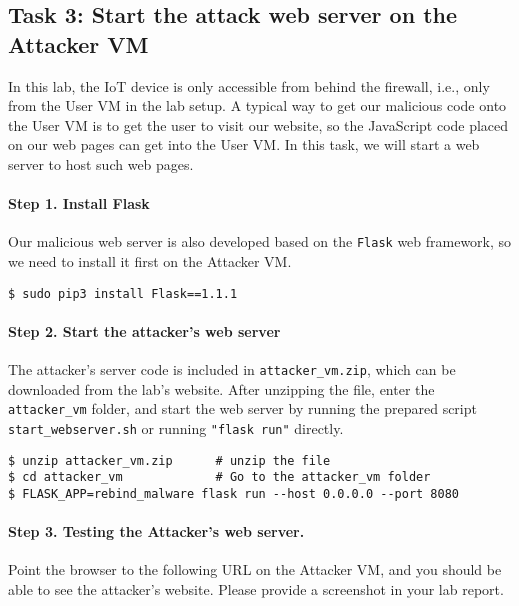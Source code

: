 \subsection{Task 3: Start the attack web server on the Attacker VM}

In this lab, the IoT device is only accessible from behind the firewall, i.e., 
only from the User VM in the lab setup. A typical way to get our 
malicious code onto the User VM is to get the user to visit 
our website, so the JavaScript code placed on our web pages 
can get into the User VM. In this task, we will start 
a web server to host such web pages. 

\paragraph{Step 1. Install Flask}
Our malicious web server is also developed based on the 
\texttt{Flask} web framework, so we need to 
install it first on the Attacker VM. 


\begin{lstlisting}
$ sudo pip3 install Flask==1.1.1
\end{lstlisting}


\paragraph{Step 2. Start the attacker's web server}
The attacker's server code is included in \texttt{attacker\_vm.zip}, which
can be downloaded from the lab's website. After unzipping the file,
enter the \texttt{attacker\_vm} folder, and start the web server by
running the prepared script \texttt{start\_webserver.sh} or running
\texttt{"flask run"} directly. 



\begin{lstlisting}
$ unzip attacker_vm.zip      # unzip the file
$ cd attacker_vm             # Go to the attacker_vm folder
$ FLASK_APP=rebind_malware flask run --host 0.0.0.0 --port 8080
\end{lstlisting}



\paragraph{Step 3. Testing the Attacker's web server.}
Point the browser to the following URL on the Attacker VM, and you should 
be able to see the attacker's website. 
Please provide a screenshot in your lab report. 


